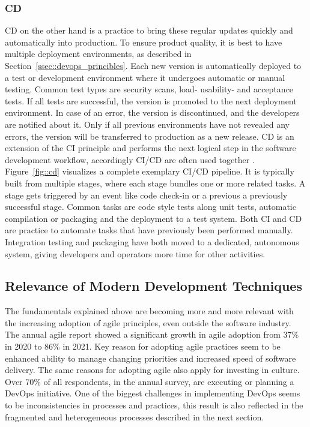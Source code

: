 \documentclass[12pt, a4paper]{article}
\begin{document}
    \subsubsection{\acl{CD}}
    \acl{CD} on the other hand is a practice to bring these regular updates quickly and automatically into production. To ensure product quality, it is best to have multiple deployment environments, as described in Section~\ref{ssec::devops_princibles}. Each new version is automatically deployed to a test or development environment where it undergoes automatic or manual testing. Common test types are security scans, load- usability- and acceptance tests. If all tests are successful, the version is promoted to the next deployment environment. In case of an error, the version is discontinued, and the developers are notified about it. Only if all previous environments have not revealed any errors, the version will be transferred to production as a new release. \ac{CD} is an extension of the \ac{CI} principle and performs the next logical step in the software development workflow, accordingly \ac{CI}/\ac{CD} are often used together \cite{azuredevops}.\newline
    Figure~\ref{fig::cd} visualizes a complete exemplary \ac{CI}/\ac{CD} pipeline. It is typically built from multiple stages, where each stage bundles one or more related tasks. A stage gets triggered by an event like code check-in or a previous a previously successful stage. Common tasks are code style tests along unit tests, automatic compilation or packaging and the deployment to a test system.\newline
    Both \ac{CI} and \ac{CD} are practice to automate tasks that have previously been performed manually. Integration testing and packaging have both moved to a dedicated, autonomous system, giving developers and operators more time for other activities.
    

    \subsection{Relevance of Modern Development Techniques}
    The fundamentals explained above are becoming more and more relevant with the increasing adoption of agile principles, even outside the software industry. The annual agile report showed a significant growth in agile adoption from 37\% in 2020 to 86\% in 2021. Key reason for adopting agile practices seem to be enhanced ability to manage changing priorities and increased speed of software delivery. The same reasons for adopting agile also apply for investing in culture. Over 70\% of all respondents, in the annual survey, are executing or planning a DevOps initiative. One of the biggest challenges in implementing DevOps seems to be inconsistencies in processes and practices, this result is also reflected in the fragmented and heterogeneous processes described in the next section. \cite{agilereport2021}
\end{document}

